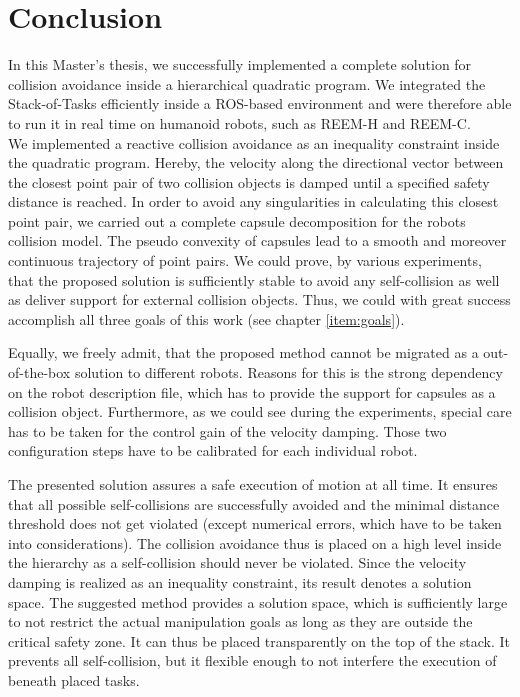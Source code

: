 \chapter{Conclusion}
\label{chap:conclusion}

In this Master's thesis, we successfully implemented a complete solution for collision avoidance inside a hierarchical quadratic program. We integrated the Stack-of-Tasks efficiently inside a ROS-based environment and were therefore able to run it in real time on humanoid robots, such as REEM-H and REEM-C. \\

We implemented a reactive collision avoidance as an inequality constraint inside the quadratic program. Hereby, the velocity along the directional vector between the closest point pair of two collision objects is damped until a specified safety distance is reached. In order to avoid any singularities in calculating this closest point pair, we carried out a complete capsule decomposition for the robots collision model. The pseudo convexity of capsules lead to a smooth and moreover continuous trajectory of point pairs. We could prove, by various experiments, that the proposed solution is sufficiently stable to avoid any self-collision as well as deliver support for external collision objects. Thus, we could with great success accomplish all three goals of this work (see chapter \ref{item:goals}).

Equally, we freely admit, that the proposed method cannot be migrated as a out-of-the-box solution to different robots. Reasons for this is the strong dependency on the robot description file, which has to provide the support for capsules as a collision object. Furthermore, as we could see during the experiments, special care has to be taken for the control gain of the velocity damping. Those two configuration steps have to be calibrated for each individual robot.

The presented solution assures a safe execution of motion at all time. It ensures that all possible self-collisions are successfully avoided and the minimal distance threshold does not get violated (except numerical errors, which have to be taken into considerations). The collision avoidance thus is placed on a high level inside the hierarchy as a self-collision should never be violated. Since the velocity damping is realized as an inequality constraint, its result denotes a solution space. The suggested method provides a solution space, which is sufficiently large to not restrict the actual manipulation goals as long as they are outside the critical safety zone. It can thus be placed transparently on the top of the stack. It prevents all self-collision, but it flexible enough to not interfere the execution of beneath placed tasks.

